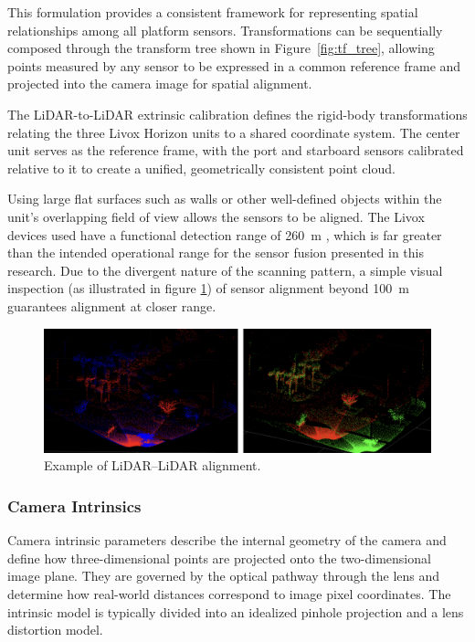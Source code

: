 \documentclass{erauthesis}
\begin{document}
This formulation provides a consistent framework for representing spatial relationships among all platform sensors.  
Transformations can be sequentially composed through the transform tree shown in Figure~\ref{fig:tf_tree}, allowing points measured by any sensor to be expressed in a common reference frame and projected into the camera image for spatial alignment.

The \ac{LiDAR}-to-\ac{LiDAR} extrinsic calibration defines the rigid-body transformations relating the three Livox Horizon units to a shared coordinate system.  
The center unit serves as the reference frame, with the port and starboard sensors calibrated relative to it to create a unified, geometrically consistent point cloud.

Using large flat surfaces such as walls or other well-defined objects within the unit's overlapping field of view allows the sensors to be aligned.
The Livox devices used have a functional detection range of 260~m \cite{livox_manual}, which is far greater than the intended operational range for the sensor fusion presented in this research. 
Due to the divergent nature of the scanning pattern, a simple visual inspection  (as illustrated in figure \ref{fig:Lidar2Lidar}) of sensor alignment beyond 100~m guarantees alignment at closer range. 

\begin{figure}[htbp]
    \centering
    \includegraphics[width=0.9\linewidth]{Images/Lidar2Lidar.png}
    \caption{Example of LiDAR–LiDAR alignment.}
    \label{fig:Lidar2Lidar}
\end{figure}

\subsubsection{Camera Intrinsics} \label{camera_intrinsics}

Camera intrinsic parameters describe the internal geometry of the camera and define how three-dimensional points are projected onto the two-dimensional image plane.  
They are governed by the optical pathway through the lens and determine how real-world distances correspond to image pixel coordinates.  
The intrinsic model is typically divided into an idealized pinhole projection and a lens distortion model.
\end{document}
